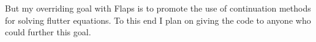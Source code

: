 \documentclass[11pt,openany,twoside]{book}
\numberwithin{equation}{section}		%
\begin{document}
But my overriding goal with Flaps is to promote the use of continuation
methods for solving flutter equations. To this end I plan on giving the
code to anyone who could further this goal.


\newpage

% 


\newpage
{}
\printindex
\end{document}
